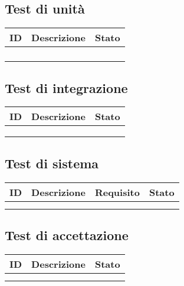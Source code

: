 \documentclass[10pt, a4paper]{article}
\begin{document}
\subsection{Test di unità}
    {\renewcommand{\arraystretch}{1.5}
    \begin{tabularx}{\textwidth}{p{}|p{}|X}
    \textbf{ID} & \textbf{Descrizione} & \textbf{Stato}  \\
    \hline
     &  & \\
    \hline
     &  &  \\
    \hline
     &  & \\
    \hline
     &  &  \\
    \end{tabularx}}
    
\subsection{Test di integrazione}
    {\renewcommand{\arraystretch}{1.5}
    \begin{tabularx}{\textwidth}{p{}|p{}|X}
    \textbf{ID} & \textbf{Descrizione} & \textbf{Stato}  \\
    \hline
     &  & \\
    \hline
     &  &  \\
    \hline
     &  & \\
    \end{tabularx}}

\subsection{Test di sistema}
    {\renewcommand{\arraystretch}{1.5}
    \begin{tabularx}{\textwidth}{p{}|p{}|p{}|X}
    \textbf{ID} & \textbf{Descrizione} & \textbf{Requisito} & \textbf{Stato}  \\
    \hline
     &  & \\
    \hline
     &  &  \\
    \end{tabularx}}

\subsection{Test di accettazione}
    {\renewcommand{\arraystretch}{1.5}
    \begin{tabularx}{\textwidth}{p{}|p{}|X}
    \textbf{ID} & \textbf{Descrizione} & \textbf{Stato}  \\
    \hline
     &  & \\
    \hline
     &  &  \\
    \end{tabularx}}
    
\end{document}
